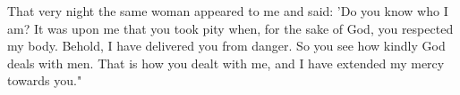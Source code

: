 That very night the same woman appeared to me and said: 'Do
you know who I am? It was upon me that you took pity when, for
the sake of God, you respected my body. Behold, I have delivered
you from danger. So you see how kindly God deals with men. That
is how you dealt with me, and I have extended my mercy towards
you."

